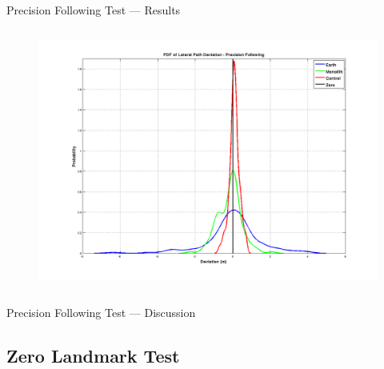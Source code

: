 \documentclass{beamer}
\begin{document}
\begin{frame}{Precision Following Test --- Results}
\begin{columns}
\begin{column}{0.5\textwidth}
\begin{figure}
          \end{figure}
          \vspace{-20pt}
          \begin{figure}
            \includegraphics[width=\textwidth]{../graphics/precision_following_dev_pdf.png}
          \end{figure}
        \end{column}
      \end{columns}
    \end{frame}

    \begin{frame}{Precision Following Test --- Discussion}
    \end{frame}


  \subsection{Zero Landmark Test}
\end{document}
